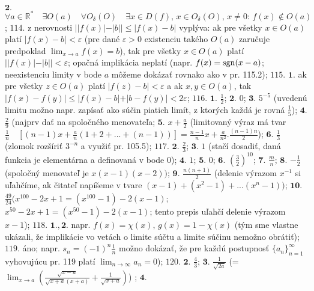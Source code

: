 $\boldsymbol{2.}$
$\forall a \in \mathbb {R^{*}} \quad \exists O(a) \quad \forall O_{\delta} (O) \quad \exists x \in D(f), \, x\in O_{ \delta}(O), \, x \ne 0: \, f(x)\notin O(a) $;
$\boxed{114.}$
z nerovnosti $ \vert \vert f(x) \vert - \vert b \vert \vert \leq \vert f(x) - b \vert$ vyplýva: ak pre všetky $ x \in O(a)$ platí $ \vert f(x) - b \vert < \varepsilon $ (pre dané $\varepsilon > 0  $ existenciu takého $O(a) $ zaručuje predpoklad $\lim_{x \to a}f(x)=b$), tak pre všetky $ x \in O(a) $ platí $ \vert \vert f(x) \vert - \vert b \vert \vert < \varepsilon  $; opačná implikácia neplatí (napr. $f(x)= \operatorname{sgn} (x-a) $; neexistenciu limity v bode $a$ môžeme dokázať rovnako ako v pr. 115.2);
$\boxed{115.}$
$\boldsymbol{1.}$
ak pre všetky $ z\in O(a )$ platí $ \vert f(z) - b \vert < \varepsilon $ a ak $ x, y \in O(a ) $, tak $ \vert f(x) - f(y) \vert \leq \vert f(x) - b \vert + \vert b - f(y) \vert < 2\varepsilon $;
$\boxed{116.}$
$\boldsymbol{1.}$
$ \frac{1}{2}$;
$\boldsymbol{2.}$
$0$;
$\boldsymbol{3.}$
$5^{-5}$ (uvedenú limitu  možno napr. zapísať ako súčin piatich limít, z ktorých každá je rovná $ \frac{1}{5}$);
$\boldsymbol{4.}$
$\frac{2}{9}$ (najprv dať na spoločného menovateľa;
$\boldsymbol{5.}$
$x+ \frac{a}{2}$ (limitovaný výraz má tvar $ \frac{1}{n} \quad [(n-1)x+ \frac{a}{n} (1+2+...+(n-1))]= \frac{n-1}{n}x+\frac{a}{n^{2}}. \frac{(n-1)n}{2}$);
$\boldsymbol{6.}$
$\frac{1}{3}$ (zlomok rozšíriť $3^{-n}$ a využiť pr. 105.5);
$\boxed{117.}$
$\boldsymbol{2.}$
$\frac{2}{3}$;	
$\boldsymbol{3.}$
$1$ (stačí dosadiť, daná funkcia je elementárna a definovaná v bode 0);
$\boldsymbol{4.}$
$1$;
$\boldsymbol{5.}$
$0$;
$\boldsymbol{6.}$
$(\frac{3}{2})^{10}$;
$\boldsymbol{7.}$
$\frac{m}{n}$;
$\boldsymbol{8.}$
$-\frac{1}{2}$ (spoločný menovateľ je $ x(x-1)(x-2))$;
$\boldsymbol{9.}$
$\frac{n(n+1)}{2}$ (delenie výrazom $ x^{-1} $ si uľahčíme, ak čitateľ napíšeme v tvare $ (x-1)+(x^{2}-1)+...(x^{n}-1))$;
$\boldsymbol{10.}$
$\frac{49}{24}(x^{100}-2x+1=(x^{100}-1)-2(x-1)$; $x^{50}-2x+1=(x^{50}-1)-2(x-1)$; tento prepis uľahčí delenie výrazom $x-1$);
$\boxed{118.}$
$\boldsymbol{1.,2.}$
napr. $f(x)=\chi (x), \, g(x)=1-\chi (x) $ (tým sme vlastne ukázali, že implikácie  vo vetách o limite súčtu a limite súčinu nemožno obrátiť);
$\boxed{119.}$
áno; napr. $ s_{n}=(-1)^{n}\frac{1}{n}$ možno dokázať, že pre každú postupnosť  $\lbrace a_{n}\rbrace_{n=1}^\infty $ vyhovujúcu pr. 119 platí $\lim_{n \to \infty}a_n =0$);
$\boxed{120.}$
$\boldsymbol{2.}$
$\frac{4}{3}$;
$\boldsymbol{3.}$
$\frac{1}{\sqrt{2a}}$ (= $\lim_{x \to a}( \frac{\sqrt{x-a}}{\sqrt{x+a}(x+a)}+\frac{1}{\sqrt{x+a}})$) ;
$\boldsymbol{4.}$
